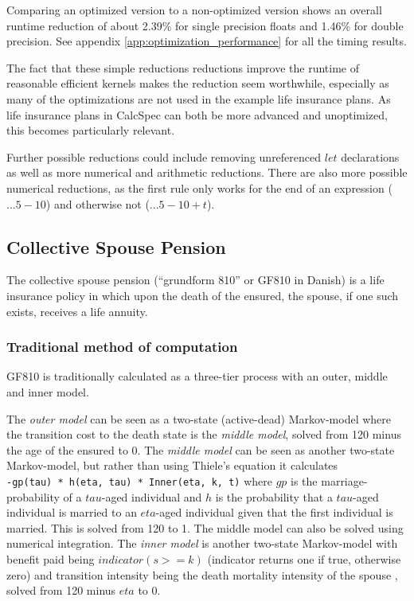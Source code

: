 Comparing an optimized version to a non-optimized version shows an overall runtime reduction of about 2.39\% for single precision floats and 1.46\% for double precision.
See appendix \ref{app:optimization_performance} for all the timing results.

The fact that these simple reductions reductions improve the runtime of reasonable efficient kernels makes the reduction seem worthwhile, especially as many of the optimizations are not used in the example life insurance plans.
As life insurance plans in CalcSpec can both be more advanced and unoptimized, this becomes particularly relevant.

Further possible reductions could include removing unreferenced $let$ declarations as well as more numerical and arithmetic reductions.
There are also more possible numerical reductions, as the first rule only works for the end of an expression ($... 5 - 10$) and otherwise not ($... 5 - 10 + t$).

\subsection{Collective Spouse Pension}\label{sub:gf810}
The collective spouse pension (``grundform 810'' or GF810 in Danish) is a life insurance policy in which upon the death of the ensured, the spouse, if one such exists, receives a life annuity.

\subsubsection{Traditional method of computation}
GF810 is traditionally calculated as a three-tier process with an outer, middle and inner model.

The \emph{outer model} can be seen as a two-state (active-dead) Markov-model where the transition cost to the death state is the \emph{middle model}, solved from 120 minus the age of the ensured to 0.
The \emph{middle model} can be seen as another two-state Markov-model, but rather than using Thiele's equation it calculates \\\lstinline$-gp(tau) * h(eta, tau) * Inner(eta, k, t)$ where $gp$ is the marriage-probability of a $tau$-aged individual and $h$ is the probability that a $tau$-aged individual is married to an $eta$-aged individual given that the first individual is married.
This is solved from 120 to 1. The middle model can also be solved using numerical integration.
The \emph{inner model} is another two-state Markov-model with benefit paid being $indicator(s >= k)$ (indicator returns one if true, otherwise zero) and transition intensity being the death mortality intensity of the spouse , solved from 120 minus $eta$ to 0.

